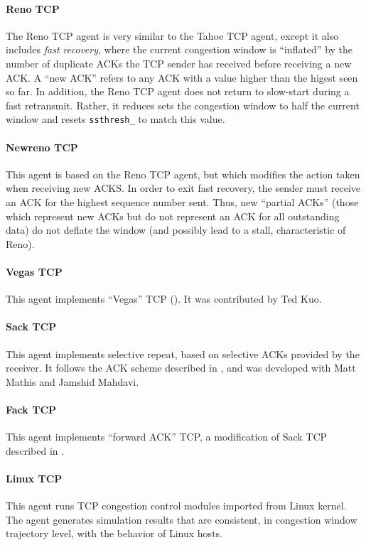 \paragraph{Reno TCP}
The Reno TCP agent is very similar to the Tahoe TCP agent,
except it also includes {\em fast recovery}, where the current
congestion window is ``inflated'' by the number of duplicate ACKs
the TCP sender has received before receiving a new ACK.
A ``new ACK'' refers to any ACK with a value higher than the higest
seen so far.
In addition, the Reno TCP agent does not return to slow-start during
a fast retransmit.
Rather, it reduces sets the congestion window to half the current
window and resets {\tt ssthresh\_} to match this value.

\paragraph{Newreno TCP}
This agent is based on the Reno TCP agent, but which modifies the
action taken when receiving new ACKS.
In order to exit fast recovery, the sender must receive an ACK for the
highest sequence number sent.
Thus, new ``partial ACKs'' (those which represent new ACKs but do not
represent an ACK for all outstanding data) do not deflate the window
(and possibly lead to a stall, characteristic of Reno).

\paragraph{Vegas TCP}
This agent implements ``Vegas'' TCP (\cite{Brak94:TCP,Brak94a:TCP}).
It was contributed by Ted Kuo.

\paragraph{Sack TCP}
This agent implements selective repeat, based on selective ACKs provided
by the receiver.
It follows the ACK scheme described in \cite{rfc2018}, and was developed
with Matt Mathis and Jamshid Mahdavi.

\paragraph{Fack TCP}
This agent implements ``forward ACK'' TCP, a modification of Sack
TCP described in \cite{Math96:Forward}.

\paragraph{Linux TCP}
This agent runs TCP congestion control modules imported from Linux kernel.
The agent generates simulation results that are consistent, in congestion window trajectory level, with the behavior of Linux hosts.

